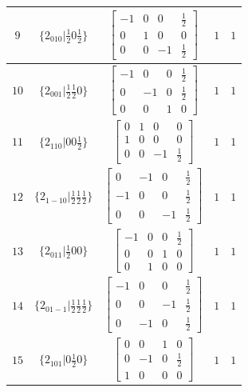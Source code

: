 \documentclass[fleqn,8pt]{jsarticle}
\begin{document}
\begin{longtable}{ccccc}
$ 9 $ & $ \{2{}_{010}|\frac{1}{2} 0 \frac{1}{2}\} $ & $ \begin{bmatrix} -1 & 0 & 0 & \frac{1}{2} \\ 0 & 1 & 0 & 0 \\ 0 & 0 & -1 & \frac{1}{2} \end{bmatrix} $ & $ 1 $ & $ 1 $ \\ \hline
$ 10 $ & $ \{2{}_{001}|\frac{1}{2} \frac{1}{2} 0\} $ & $ \begin{bmatrix} -1 & 0 & 0 & \frac{1}{2} \\ 0 & -1 & 0 & \frac{1}{2} \\ 0 & 0 & 1 & 0 \end{bmatrix} $ & $ 1 $ & $ 1 $ \\ \hline
$ 11 $ & $ \{2{}_{110}|0 0 \frac{1}{2}\} $ & $ \begin{bmatrix} 0 & 1 & 0 & 0 \\ 1 & 0 & 0 & 0 \\ 0 & 0 & -1 & \frac{1}{2} \end{bmatrix} $ & $ 1 $ & $ 1 $ \\ \hline
$ 12 $ & $ \{2{}_{1-10}|\frac{1}{2} \frac{1}{2} \frac{1}{2}\} $ & $ \begin{bmatrix} 0 & -1 & 0 & \frac{1}{2} \\ -1 & 0 & 0 & \frac{1}{2} \\ 0 & 0 & -1 & \frac{1}{2} \end{bmatrix} $ & $ 1 $ & $ 1 $ \\ \hline
$ 13 $ & $ \{2{}_{011}|\frac{1}{2} 0 0\} $ & $ \begin{bmatrix} -1 & 0 & 0 & \frac{1}{2} \\ 0 & 0 & 1 & 0 \\ 0 & 1 & 0 & 0 \end{bmatrix} $ & $ 1 $ & $ 1 $ \\ \hline
$ 14 $ & $ \{2{}_{01-1}|\frac{1}{2} \frac{1}{2} \frac{1}{2}\} $ & $ \begin{bmatrix} -1 & 0 & 0 & \frac{1}{2} \\ 0 & 0 & -1 & \frac{1}{2} \\ 0 & -1 & 0 & \frac{1}{2} \end{bmatrix} $ & $ 1 $ & $ 1 $ \\ \hline
$ 15 $ & $ \{2{}_{101}|0 \frac{1}{2} 0\} $ & $ \begin{bmatrix} 0 & 0 & 1 & 0 \\ 0 & -1 & 0 & \frac{1}{2} \\ 1 & 0 & 0 & 0 \end{bmatrix} $ & $ 1 $ & $ 1 $ \\ \hline

\end{longtable}
\end{document}
